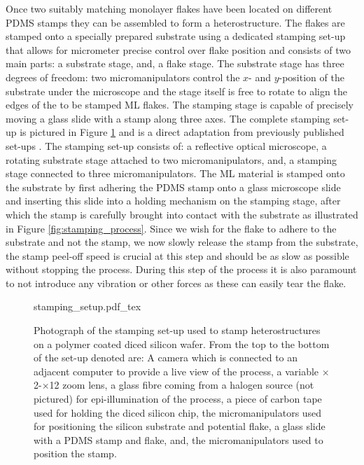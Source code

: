 Once two suitably matching monolayer flakes have been located on different PDMS stamps they can be assembled to form a heterostructure.
The flakes are stamped onto a specially prepared substrate using a dedicated stamping set-up that allows for micrometer precise control over flake position and consists of two main parts: a substrate stage, and, a flake stage.
The substrate stage has three degrees of freedom: two micromanipulators control the $x$- and $y$-position of the substrate under the microscope and the stage itself is free to rotate to align the edges of the to be stamped ML flakes.
The stamping stage is capable of precisely moving a glass slide with a stamp along three axes.
The complete stamping set-up is pictured in Figure \ref{fig:stamping_set-up} and is a direct adaptation from previously published set-ups \cite{castellanos-gomezDeterministicTransferTwodimensional2014, castellanos-gomezDeterministicTransferTwodimensional2014a}.
The stamping set-up consists of: a reflective optical microscope, a rotating substrate stage attached to two micromanipulators, and, a stamping stage connected to three micromanipulators.
The ML material is stamped onto the substrate by first adhering the PDMS stamp onto a glass microscope slide and inserting this slide into a holding mechanism on the stamping stage, after which the stamp is carefully brought into contact with the substrate as illustrated in Figure \ref{fig:stamping_process}.
Since we wish for the flake to adhere to the substrate and not the stamp, we now slowly release the stamp from the substrate, the stamp peel-off speed is crucial at this step and should be as slow as possible without stopping the process.
During this step of the process it is also paramount to not introduce any vibration or other forces as these can easily tear the flake.
\begin{figure}[h]
	\centering
	\def\svgwidth{1\linewidth}
	{stamping_setup.pdf_tex}
    \caption{Photograph of the stamping set-up used to stamp heterostructures on a polymer coated diced silicon wafer. From the top to the bottom of the set-up denoted are: A camera which is connected to an adjacent computer to provide a live view of the process, a variable $\times$2\--$\times$12  zoom lens, a glass fibre coming from a halogen source (not pictured) for epi-illumination of the process, a piece of carbon tape used for holding the diced silicon chip, the micromanipulators used for positioning the silicon substrate and potential flake, a glass slide with a PDMS stamp and flake, and, the micromanipulators used to position the stamp.}
	\label{fig:stamping_set-up}
\end{figure}

